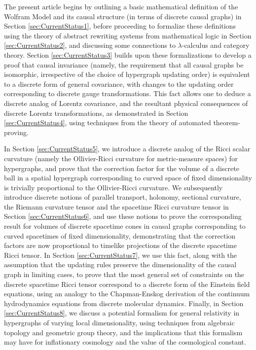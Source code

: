 \documentclass{article}
\begin{document}
The present article begins by outlining a basic mathematical definition of the Wolfram Model and its causal structure (in terms of discrete causal graphs) in Section \ref{sec:CurrentStatus1}, before proceeding to formalize these definitions using the theory of abstract rewriting systems from mathematical logic in Section \ref{sec:CurrentStatus2}, and discussing some connections to ${\lambda}$-calculus and category theory. Section \ref{sec:CurrentStatus3} builds upon these formalizations to develop a proof that causal invariance (namely, the requirement that all causal graphs be isomorphic, irrespective of the choice of hypergraph updating order) is equivalent to a discrete form of general covariance, with changes to the updating order corresponding to discrete gauge transformations. This fact allows one to deduce a discrete analog of Lorentz covariance, and the resultant physical consequences of discrete Lorentz transformations, as demonstrated in Section \ref{sec:CurrentStatus4}, using techniques from the theory of automated theorem-proving.

In Section \ref{sec:CurrentStatus5}, we introduce a discrete analog of the Ricci scalar curvature (namely the Ollivier-Ricci curvature for metric-measure spaces) for hypergraphs, and prove that the correction factor for the volume of a discrete ball in a spatial hypergraph corresponding to curved space of fixed dimensionality is trivially proportional to the Ollivier-Ricci curvature. We subsequently introduce discrete notions of parallel transport, holonomy, sectional curvature, the Riemann curvature tensor and the spacetime Ricci curvature tensor in Section \ref{sec:CurrentStatus6}, and use these notions to prove the corresponding result for volumes of discrete spacetime cones in causal graphs corresponding to curved spacetimes of fixed dimensionality, demonstrating that the correction factors are now proportional to timelike projections of the discrete spacetime Ricci tensor. In Section \ref{sec:CurrentStatus7}, we use this fact, along with the assumption that the updating rules preserve the dimensionality of the causal graph in limiting cases, to prove that the most general set of constraints on the discrete spacetime Ricci tensor correspond to a discrete form of the Einstein field equations, using an analogy to the Chapman-Enskog derivation of the continuum hydrodynamics equations from discrete molecular dynamics. Finally, in Section \ref{sec:CurrentStatus8}, we discuss a potential formalism for general relativity in hypergraphs of varying local dimensionality, using techniques from algebraic topology and geometric group theory, and the implications that this formalism may have for inflationary cosmology and the value of the cosmological constant.
\end{document}

